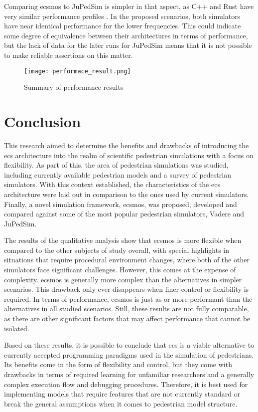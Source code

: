 \documentclass[twoside, 11pt]{article}
\begin{document}
Comparing \gls{ecsmos} to JuPedSim is simpler in that aspect, as C++ and Rust have very similar performance profiles \cite{electronics12010143}. In the proposed scenarios, both simulators have near identical performance for the lower frequencies. This could indicate some degree of equivalence between their architectures in terms of performance, but the lack of data for the later runs for JuPedSim means that it is not possible to make reliable assertions on this matter.

\begin{figure}
  \centering
  \texttt{[image: performace\_result.png]}
  \caption[Summary of performance results]{Summary of performance results}
  \label{fig:performace-results}
\end{figure}

\section{Conclusion} \label{sec:conclusion}

This research aimed to determine the benefits and drawbacks of introducing the \gls{ecs} architecture into the realm of scientific pedestrian simulations with a focus on flexibility. As part of this, the area of pedestrian simulations was studied, including currently available pedestrian models and a survey of pedestrian simulators. With this context established, the characteristics of the \gls{ecs} architecture were laid out in comparison to the ones used by current simulators. Finally, a novel simulation framework, \gls{ecsmos}, was proposed, developed and compared against some of the most popular pedestrian simulators, Vadere and JuPedSim.

The results of the qualitative analysis show that \gls{ecsmos} is more flexible when compared to the other subjects of study overall, with special highlights in situations that require procedural environment changes, where both of the other simulators face significant challenges. However, this comes at the expense of complexity. \gls{ecsmos} is generally more complex than the alternatives in simpler scenarios. This drawback only ever disappears when finer control or flexibility is required. In terms of performance, \gls{ecsmos} is just as or more performant than the alternatives in all studied scenarios. Still, these results are not fully comparable, as there are other significant factors that may affect performance that cannot be isolated.

Based on these results, it is possible to conclude that \gls{ecs} is a viable alternative to currently accepted programming paradigms used in the simulation of pedestrians. Its benefits come in the form of flexibility and control, but they come with drawbacks in terms of required learning for unfamiliar researchers and a generally complex execution flow and debugging procedures. Therefore, it is best used for implementing models that require features that are not currently standard or break the general assumptions when it comes to pedestrian model structure.
\end{document}
